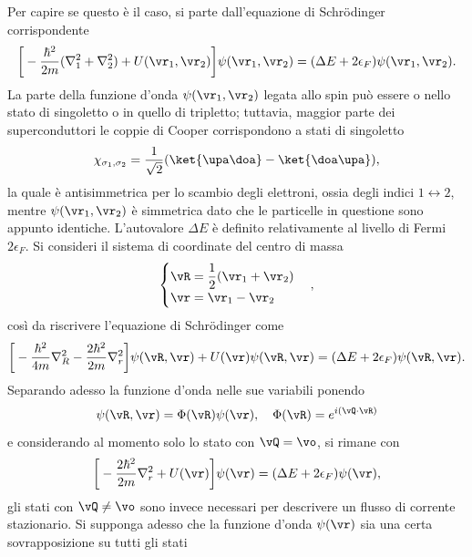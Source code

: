 Per capire se questo è il caso, si parte dall'equazione di Schr\"odinger corrispondente
\begin{equation}
\label{eq: equazione di Schrodinger BCS completa}
    \bigg[-\frac{\hbar^2}{2m}(\nabla^2_1 + \nabla_2^2) + U(\vr_1,\vr_2)\bigg]\psi(\vr_1,\vr_2) = (\Delta E + 2\epsilon_F)\psi(\vr_1,\vr_2).
\end{equation}
La parte della funzione d'onda $\psi(\vr_1,\vr_2)$ legata allo spin può essere o nello stato di singoletto o in quello di tripletto; tuttavia, maggior parte dei superconduttori le coppie di Cooper corrispondono a stati di singoletto
\begin{equation}
    \chi_{\sigma_1,\sigma_2} = \frac{1}{\sqrt{2}}(\ket{\upa\doa} - \ket{\doa\upa}),
\end{equation}
la quale è antisimmetrica per lo scambio degli elettroni, ossia degli indici $1 \leftrightarrow 2$, mentre $\psi(\vr_1,\vr_2)$ è simmetrica dato che le particelle in questione sono appunto identiche. L'autovalore $\Delta E$ è definito relativamente al livello di Fermi $2\epsilon_F$. Si consideri il sistema di coordinate del centro di massa
\begin{equation}
    \begin{cases}
        \vR = \dfrac{1}{2}(\vr_1 + \vr_2) \\
        \vr = \vr_1 - \vr_2
    \end{cases},
\end{equation}
così da riscrivere l'equazione di Schr\"odinger come
\begin{equation}
   \bigg[-\frac{\hbar^2}{4m}\nabla^2_R - \frac{2\hbar^2}{2m}\nabla^2_r\bigg]\psi(\vR,\vr) + U(\vr)\psi(\vR,\vr) = (\Delta E + 2\epsilon_F)\psi(\vR,\vr).
\end{equation}
Separando adesso la funzione d'onda nelle sue variabili ponendo
\begin{equation}
    \psi(\vR,\vr) = \Phi(\vR)\psi(\vr),\quad \Phi(\vR) = e^{i(\vQ\cdot \vR)}
\end{equation}
e considerando al momento solo lo stato con $\vQ = \vo$, si rimane con
\begin{equation}
\label{eq: equazione di Schrodinger BCS psi(r)}
   \bigg[- \frac{2\hbar^2}{2m}\nabla^2_r + U(\vr)\bigg]\psi(\vr) = (\Delta E + 2\epsilon_F)\psi(\vr),
\end{equation}
gli stati con $\vQ \neq \vo$ sono invece necessari per descrivere un flusso di corrente stazionario. Si supponga adesso che la funzione d'onda $\psi(\vr)$ sia una certa sovrapposizione su tutti gli stati
